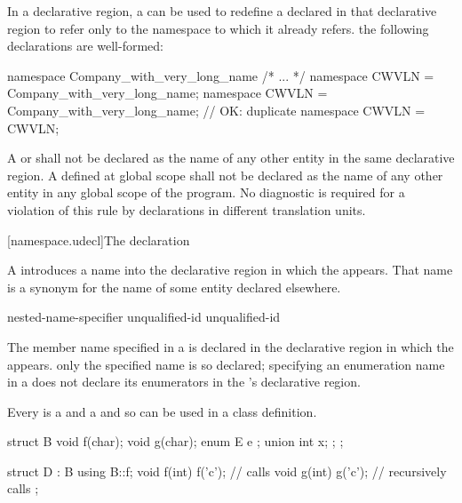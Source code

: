 \pnum
In a declarative region, a  can be
used to redefine a  declared in that
declarative region to refer only to the namespace to which it already
refers.
\enterexample
the following declarations are well-formed:

\begin{codeblock}
namespace Company_with_very_long_name { /* ... */ }
namespace CWVLN = Company_with_very_long_name;
namespace CWVLN = Company_with_very_long_name;          // OK: duplicate
namespace CWVLN = CWVLN;
\end{codeblock}
\exitexampleb

\pnum
A  or  shall not be
declared as the name of any other entity in the same declarative region.
A  defined at global scope shall not be
declared as the name of any other entity in any global scope of the
program. No diagnostic is required for a violation of this rule by
declarations in different translation units.

[namespace.udecl]{The  declaration}%

\pnum
A  introduces a name into the declarative
region in which the  appears. That name is
a synonym for the name of some entity declared elsewhere.

\begin{bnf}
\br
     nested-name-specifier unqualified-id \terminal{;}\br
     unqualified-id \terminal{;}
\end{bnf}

\pnum
The member name specified in a  is declared
in the declarative region in which the 
appears. \enternote only the specified name is so declared; specifying
an enumeration name in a  does not declare
its enumerators in the 's declarative
region.
\exitnote

\pnum
Every  is a  and a
 and so can be used in a class definition.
\enterexample

\begin{codeblock}
struct B {
	void f(char);
	void g(char);
	enum E { e };
	union { int x; };
};

struct D : B {
	using B::f;
	void f(int) { f('c'); }		// calls 
	void g(int) { g('c'); }		// recursively calls 
};
\end{codeblock}
\exitexampleb

